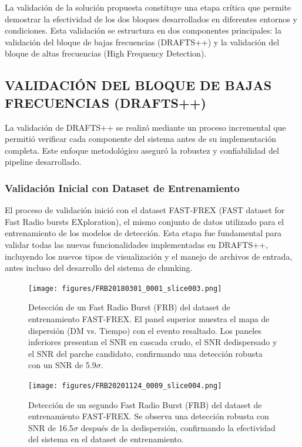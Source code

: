 
La validación de la solución propuesta constituye una etapa crítica que permite demostrar la efectividad de los dos bloques desarrollados en diferentes entornos y condiciones. Esta validación se estructura en dos componentes principales: la validación del bloque de bajas frecuencias (DRAFTS++) y la validación del bloque de altas frecuencias (High Frequency Detection).

\subsection{VALIDACIÓN DEL BLOQUE DE BAJAS FRECUENCIAS (DRAFTS++)}

La validación de DRAFTS++ se realizó mediante un proceso incremental que permitió verificar cada componente del sistema antes de su implementación completa. Este enfoque metodológico aseguró la robustez y confiabilidad del pipeline desarrollado.

\subsubsection{Validación Inicial con Dataset de Entrenamiento}

El proceso de validación inició con el dataset FAST-FREX (FAST dataset for Fast Radio bursts EXploration), el mismo conjunto de datos utilizado para el entrenamiento de los modelos de detección. Esta etapa fue fundamental para validar todas las nuevas funcionalidades implementadas en DRAFTS++, incluyendo los nuevos tipos de visualización y el manejo de archivos de entrada, antes incluso del desarrollo del sistema de chunking.

\begin{figure}[H]
    \centering
    \texttt{[image: figures/FRB20180301\_0001\_slice003.png]}
    \caption{Detección de un Fast Radio Burst (FRB) del dataset de entrenamiento FAST-FREX. El panel superior muestra el mapa de dispersión (DM vs. Tiempo) con el evento resaltado. Los paneles inferiores presentan el SNR en cascada crudo, el SNR dedispersado y el SNR del parche candidato, confirmando una detección robusta con un SNR de 5.9$\sigma$.}
    \label{fig:frb20180301_0001_slice003}
\end{figure}

\begin{figure}[H]
    \centering
    \texttt{[image: figures/FRB20201124\_0009\_slice004.png]}
    \caption{Detección de un segundo Fast Radio Burst (FRB) del dataset de entrenamiento FAST-FREX. Se observa una detección robusta con SNR de 16.5$\sigma$ después de la dedispersión, confirmando la efectividad del sistema en el dataset de entrenamiento.}
    \label{fig:frb20201124_0009_slice004}
\end{figure}

